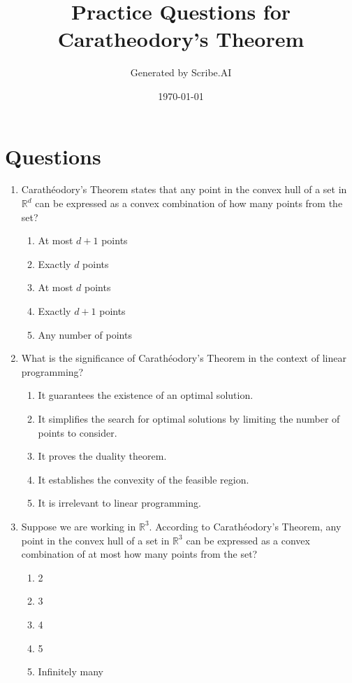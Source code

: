 \documentclass{article}%
\title{Practice Questions for Caratheodory's Theorem}%
\author{Generated by Scribe.AI}%
\date{\today}%
\begin{document}
%
\normalsize%
\maketitle%
\section{Questions}%
\label{sec:Questions}%
\begin{enumerate}%
\item Carathéodory's Theorem states that any point in the convex hull of a set in $\mathbb{R}^d$ can be expressed as a convex combination of how many points from the set?%
\begin{enumerate}%
\item At most $d+1$ points%
\item Exactly $d$ points%
\item At most $d$ points%
\item Exactly $d+1$ points%
\item Any number of points%
\end{enumerate}%
\vspace{1em}%
\item What is the significance of Carathéodory's Theorem in the context of linear programming?%
\begin{enumerate}%
\item It guarantees the existence of an optimal solution.%
\item It simplifies the search for optimal solutions by limiting the number of points to consider.%
\item It proves the duality theorem.%
\item It establishes the convexity of the feasible region.%
\item It is irrelevant to linear programming.%
\end{enumerate}%
\vspace{1em}%
\item Suppose we are working in $\mathbb{R}^3$.  According to Carathéodory's Theorem, any point in the convex hull of a set in $\mathbb{R}^3$ can be expressed as a convex combination of at most how many points from the set?%
\begin{enumerate}%
\item 2%
\item 3%
\item 4%
\item 5%
\item Infinitely many%
\end{enumerate}%

\end{enumerate}
\end{document}
